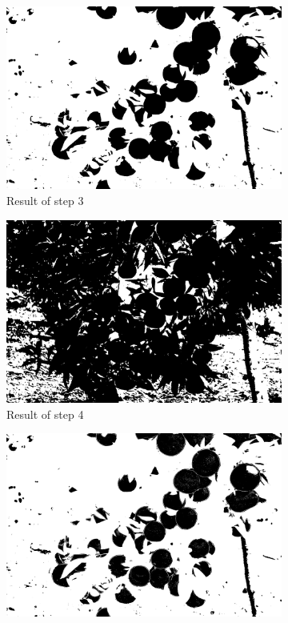 \documentclass[conference]{IEEEtran}
\begin{document}
\begin{figure}
  \begin{subfigure}{.33\linewidth}
  	\includegraphics[width=\linewidth]{citrus1/citrus1_cr.jpg}\hfill
     	\caption{Result of step 3}
  \end{subfigure}
  \begin{subfigure}{.33\linewidth}
  	\includegraphics[width=\linewidth]{citrus1/citrus1_cb.jpg}\hfill
     	\caption{Result of step 4}
  \end{subfigure}
  \begin{subfigure}{.33\linewidth}
  	\includegraphics[width=\linewidth]{citrus1/citrus1_mask.jpg}

\end{subfigure}
\end{figure}
\end{document}
